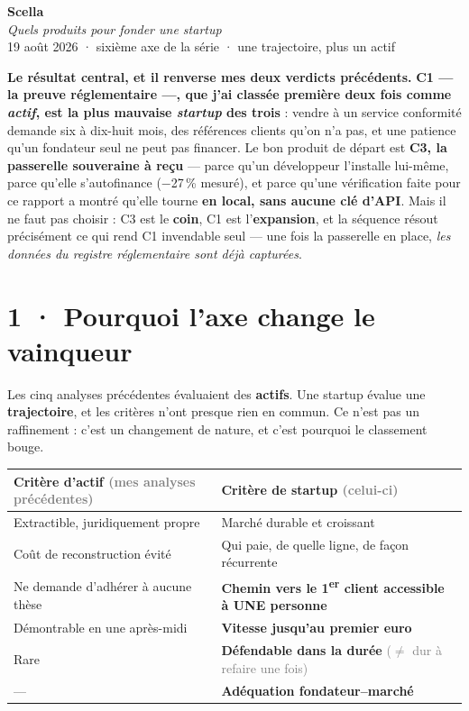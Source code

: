 \documentclass[10pt]{article}
\newcommand{\sz}[1]{\textcolor{grey}{\small\textsf{#1}}}
\newcommand{\pc}{\,\%}
\begin{document}
\begin{center}
{\Huge\bfseries\color{navy} Scella}\\[4pt]
{\large\color{grey}\itshape Quels produits pour fonder une startup}\\[4pt]
{\small\color{grey} 19 août 2026 \; · \; sixième axe de la série \; · \; une trajectoire, plus un actif}
\end{center}
\vspace{2pt}

\begin{these}
\textbf{Le résultat central, et il renverse mes deux verdicts précédents.} \textbf{C1 --- la preuve
réglementaire ---, que j'ai classée première deux fois comme \emph{actif}, est la plus mauvaise
\emph{startup} des trois} : vendre à un service conformité demande six à dix-huit mois, des références
clients qu'on n'a pas, et une patience qu'un fondateur seul ne peut pas financer. Le bon produit de
départ est \textbf{C3, la passerelle souveraine à reçu} --- parce qu'un développeur l'installe
lui-même, parce qu'elle s'autofinance ($-$27\pc{} mesuré), et parce qu'une vérification faite pour ce
rapport a montré qu'elle tourne \textbf{en local, sans aucune clé d'API}. Mais il ne faut pas choisir :
C3 est le \textbf{coin}, C1 est l'\textbf{expansion}, et la séquence résout précisément ce qui rend C1
invendable seul --- une fois la passerelle en place, \emph{les données du registre réglementaire sont
déjà capturées}.
\end{these}

\section{1 · Pourquoi l'axe change le vainqueur}

Les cinq analyses précédentes évaluaient des \textbf{actifs}. Une startup évalue une
\textbf{trajectoire}, et les critères n'ont presque rien en commun. Ce n'est pas un raffinement : c'est
un changement de nature, et c'est pourquoi le classement bouge.

\renewcommand{\arraystretch}{1.2}
\begin{center}\small
\begin{tabular}{@{}>{\raggedright\arraybackslash}p{7.4cm} >{\raggedright\arraybackslash}p{8.0cm}@{}}
\toprule
\textbf{Critère d'actif} \sz{(mes analyses précédentes)} & \textbf{Critère de startup} \sz{(celui-ci)} \\
\midrule
Extractible, juridiquement propre & Marché durable et croissant \\
Coût de reconstruction évité & Qui paie, de quelle ligne, de façon récurrente \\
Ne demande d'adhérer à aucune thèse & \textbf{Chemin vers le 1\textsuperscript{er} client accessible à UNE personne} \\
Démontrable en une après-midi & \textbf{Vitesse jusqu'au premier euro} \\
Rare & \textbf{Défendable dans la durée} \sz{($\neq$ dur à refaire une fois)} \\
--- & \textbf{Adéquation fondateur--marché} \\
\bottomrule
\end{tabular}
\end{center}
\end{document}
